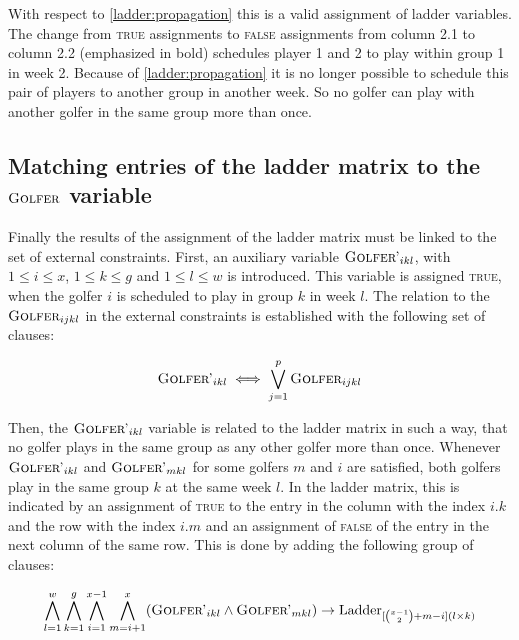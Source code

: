 \documentclass[a4paper]{scrartcl}
\begin{document}
With respect to \eqref{ladder:propagation} this is a valid assignment of ladder variables. The change from \textsc{true} assignments to \textsc{false} assignments from column 2.1 to column 2.2 (emphasized in bold) schedules player 1 and 2 to play within group 1 in week 2. Because of \eqref{ladder:propagation} it is no longer possible to schedule this pair of players to another group in another week. So no golfer can play with another golfer in the same group more than once.


\subsection{Matching entries of the ladder matrix to the $\textsc{Golfer}$ variable}

Finally the results of the assignment of the ladder matrix must be linked to the set of external constraints. First, an auxiliary variable $\textsc{Golfer'}_{ikl}$, with $1 \leq i \leq x$, $1 \leq k \leq g$ and $1 \leq l \leq w$ is introduced. This variable is assigned \textsc{true}, when the golfer $i$ is scheduled to play in group $k$ in week $l$. The relation to the $\textsc{Golfer}_{ijkl}$ in the external constraints is established with the following set of clauses:

\begin{equation}
    \textsc{Golfer'}_{ikl} \iff \bigvee \limits_{j=1}^p \textsc{Golfer}_{ijkl}
\end{equation}

Then, the $\textsc{Golfer'}_{ikl}$ variable is related to the ladder matrix in such a way, that no golfer plays in the same group as any other golfer more than once. Whenever $\textsc{Golfer'}_{ikl}$ and $\textsc{Golfer'}_{mkl}$ for some golfers $m$ and $i$ are satisfied, both golfers play in the same group $k$ at the same week $l$. In the ladder matrix, this is indicated by an assignment of \textsc{true} to the entry in the column with the index $i.k$ and the row with the index $i.m$ and an assignment of \textsc{false} of the entry in the next column of the same row. This is done by adding the following group of clauses:

\begin{equation}
\centering
    \bigwedge \limits_{l=1}^{w}
    \bigwedge \limits_{k=1}^{g}
    \bigwedge \limits_{i=1}^{x-1}
    \bigwedge \limits_{m=i+1}^{x}
    (\textsc{Golfer'}_{ikl} \wedge \textsc{Golfer'}_{mkl}) \to \text{Ladder}_{[{x-1 \choose 2}+m-i](l \times k)}
\end{equation}
\end{document}
